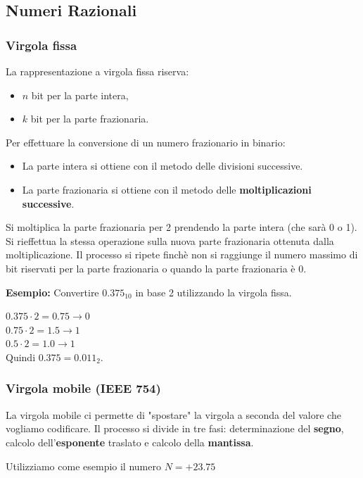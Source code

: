 \documentclass[oneside]{scrbook}
\begin{document}
\subsection{Numeri Razionali}

\subsubsection{Virgola fissa}
La rappresentazione a virgola fissa riserva:
\begin{itemize}
  \item $n$ bit per la parte intera,
  \item $k$ bit per la parte frazionaria.
\end{itemize}

Per effettuare la conversione di un numero frazionario in binario:
\begin{itemize}
    \item La parte intera si ottiene con il metodo delle divisioni successive.
    \item La parte frazionaria si ottiene con il metodo delle \textbf{moltiplicazioni successive}.
\end{itemize}
Si moltiplica la parte frazionaria per 2 prendendo la parte intera (che sarà 0 o 1). Si rieffettua la stessa operazione sulla nuova parte frazionaria ottenuta dalla moltiplicazione. Il processo si ripete finchè non si raggiunge il numero massimo di bit riservati per la parte frazionaria o quando la parte frazionaria è 0.

\textbf{Esempio: } Convertire $0.375_{10}$ in base 2 utilizzando la virgola fissa.

$0.375 \cdot 2 = 0.75 \to 0$ \\ 
$0.75 \cdot 2 = 1.5 \to 1$  \\
$0.5 \cdot 2 = 1.0 \to 1$  \\

Quindi $0.375 = 0.011_2$.


\subsubsection{Virgola mobile (IEEE 754)}
La virgola mobile ci permette di "spostare" la virgola a seconda del valore che vogliamo codificare.
Il processo si divide in tre fasi: determinazione del \textbf{segno}, calcolo dell'\textbf{esponente} traslato e calcolo della \textbf{mantissa}.

Utilizziamo come esempio il numero $N = +23.75$
\end{document}
